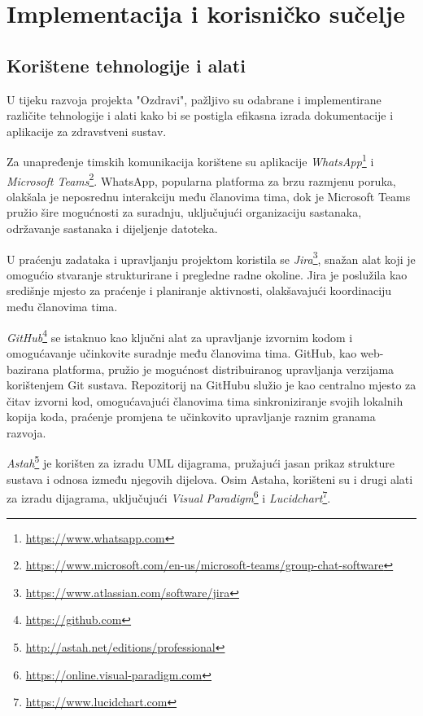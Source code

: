 \chapter{Implementacija i korisničko sučelje}
		\section{Korištene tehnologije i alati}
		
			
			
			 U tijeku razvoja projekta "Ozdravi", pažljivo su odabrane i implementirane različite tehnologije i alati kako bi se postigla efikasna izrada dokumentacije i aplikacije za zdravstveni sustav.

			 Za unapređenje timskih komunikacija korištene su aplikacije \textit{WhatsApp}\footnote{\url{https://www.whatsapp.com}} i \textit{Microsoft Teams}\footnote{\url{https://www.microsoft.com/en-us/microsoft-teams/group-chat-software}}. WhatsApp, popularna platforma za brzu razmjenu poruka, olakšala je neposrednu interakciju među članovima tima, dok je Microsoft Teams pružio šire mogućnosti za suradnju, uključujući organizaciju sastanaka, održavanje sastanaka i dijeljenje datoteka.
			 
			 U praćenju zadataka i upravljanju projektom koristila se \textit{Jira}\footnote{\url{https://www.atlassian.com/software/jira}}, snažan alat koji je omogućio stvaranje strukturirane i pregledne radne okoline. Jira je poslužila kao središnje mjesto za praćenje i planiranje aktivnosti, olakšavajući koordinaciju među članovima tima.

			 \textit{GitHub}\footnote{\url{https://github.com}} se istaknuo kao ključni alat za upravljanje izvornim kodom i omogućavanje učinkovite suradnje među članovima tima. GitHub, kao web-bazirana platforma, pružio je mogućnost distribuiranog upravljanja verzijama korištenjem Git sustava. Repozitorij na GitHubu služio je kao centralno mjesto za čitav izvorni kod, omogućavajući članovima tima sinkroniziranje svojih lokalnih kopija koda, praćenje promjena te učinkovito upravljanje raznim granama razvoja.

			 \textit{Astah}\footnote{\url{http://astah.net/editions/professional}} je korišten za izradu UML dijagrama, pružajući jasan prikaz strukture sustava i odnosa između njegovih dijelova. Osim Astaha, korišteni su i drugi alati za izradu dijagrama, uključujući \textit{Visual Paradigm}\footnote{\url{https://online.visual-paradigm.com}} i \textit{Lucidchart}\footnote{\url{https://www.lucidchart.com}}.
			 
